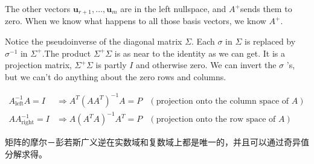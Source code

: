 The other vectors $\boldsymbol{u}_{r+1}, \ldots, \boldsymbol{u}_{m}$ are in the left nullspace, and $A^{+}$sends them to zero. When we know what happens to all those basis vectors, we know $A^{+}$.

Notice the pseudoinverse of the diagonal matrix $\Sigma .$ Each $\sigma$ in $\Sigma$ is replaced by $\sigma^{-1}$ in $\Sigma^{+} .$The product $\Sigma^{+} \Sigma$ is as near to the identity as we can get. It is a projection matrix, $\Sigma^{+} \Sigma$ is partly $I$ and otherwise zero. We can invert the $\sigma$ 's, but we can't do anything about the zero rows and columns. 


\begin{theorem}
    $$\displaystyle \begin{aligned}
        A_{\text{left}}^{-1} A=I & \Rightarrow A^{T}\left( AA^{T}\right)^{-1} A=P & \left(\text{projection onto the column space of } A\right)\\
        AA_{\text{right}}^{-1} =I & \Rightarrow A\left( A^{T} A\right)^{-1} A^{T} =P & \left(\text{projection onto the row space of } A\right)
        \end{aligned}$$
\end{theorem}

\begin{remark}
    矩阵的摩尔－彭若斯广义逆在实数域和复数域上都是唯一的，并且可以通过奇异值分解求得。
\end{remark}

